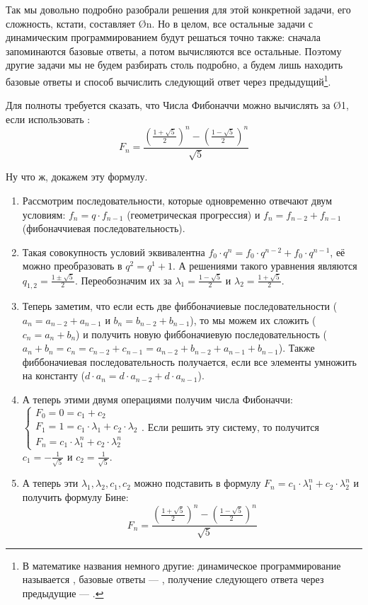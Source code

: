 Так мы довольно подробно разобрали решения для этой конкретной задачи, его сложность, кстати, составляет \O{n}. Но в целом, все остальные задачи с динамическим программированием будут решаться точно также: сначала запоминаются базовые ответы, а потом вычисляются все остальные. Поэтому другие задачи мы не будем разбирать столь подробно, а будем лишь находить базовые ответы и способ вычислить следующий ответ через предыдущий\footnote{В математике названия немного другие: динамическое программирование называется , базовые ответы — , получение следующего ответа через предыдущие — .
}. 

Для полноты требуется сказать, что Числа Фибоначчи можно вычислять за \O{1}, если использовать :
$$ F_n = \frac{ \left(\frac{1 + \sqrt{5}}{2}\right)^n - \left(\frac{1 - \sqrt{5}}{2}\right)^n }{\sqrt{5}} $$

Ну что ж, докажем эту формулу.

\begin{enumerate}
    \item Рассмотрим последовательности, которые одновременно отвечают двум условиям: $f_n = q \cdot f_{n - 1}$ (геометрическая прогрессия) и $f_n = f_{n - 2} + f_{n - 1}$ (фибоначчиевая последовательность).
    \item Такая совокупность условий эквивалентна $f_0 \cdot q^n = f_0 \cdot q^{n - 2} + f_0 \cdot q^{n - 1}$, её можно преобразовать в $q^2 = q^1 + 1$. А решениями такого уравнения являются $q_{1, 2} = \frac{1 \pm \sqrt{5}}{2}$. Переобозначим их за $\lambda_1 = \frac{1 - \sqrt{5}}{2}$ и $\lambda_2 = \frac{1 + \sqrt{5}}{2}$.
    \item Теперь заметим, что если есть две фиббоначиевые последовательности ($a_n = a_{n - 2} + a_{n - 1}$ и $b_n = b_{n - 2} + b_{n - 1}$), то мы можем их сложить ($c_n = a_n + b_n$) и получить новую фиббоначиевую последовательность ($a_n + b_n = c_n = c_{n - 2} + c_{n - 1} = a_{n - 2} + b_{n - 2} + a_{n - 1} + b_{n - 1}$). Также фиббоначиевая последовательность получается, если все элементы умножить на константу ($d \cdot a_n = d \cdot a_{n - 2} + d \cdot a_{n - 1}$).
    \item А теперь этими двумя операциями получим числа Фибоначчи:
        $\begin{cases}
        F_0=0=c_1 + c_2 \\
        F_1=1=c_1 \cdot \lambda_1 + c_2 \cdot \lambda_2 \\
        F_n= c_1 \cdot \lambda_1^n + c_2 \cdot \lambda_2^n
        \end{cases}$.
    Если решить эту систему, то получится $c_1 = -\frac{1}{\sqrt{5}}$ и $c_2 = \frac{1}{\sqrt{5}}$.
    \item А теперь эти $\lambda_1, \lambda_2, c_1, c_2$ можно подставить в формулу $F_n= c_1 \cdot \lambda_1^n + c_2 \cdot \lambda_2^n$ и получить формулу Бине:
    $$ F_n = \frac{ \left(\frac{1 + \sqrt{5}}{2}\right)^n - \left(\frac{1 - \sqrt{5}}{2}\right)^n }{\sqrt{5}} $$
\end{enumerate}



